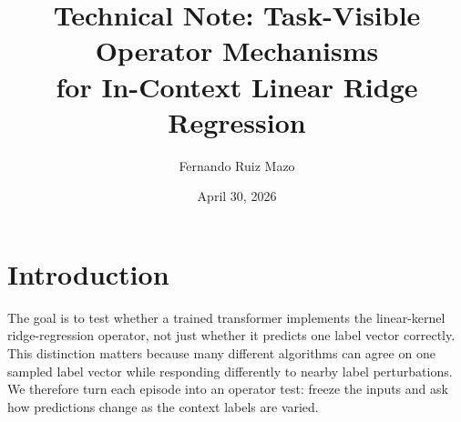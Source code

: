\documentclass[11pt]{article}
\title{Technical Note: Task-Visible Operator Mechanisms\\
for In-Context Linear Ridge Regression}
\author{Fernando Ruiz Mazo}
\date{April 30, 2026}
\begin{document}
\maketitle

\section{Introduction}

The goal is to test whether a trained transformer implements the linear-kernel ridge-regression
operator, not just whether it predicts one label vector correctly. This distinction matters because
many different algorithms can agree on one sampled label vector while responding differently to
nearby label perturbations. We therefore turn each episode into an operator test: freeze the inputs
and ask how predictions change as the context labels are varied.
\end{document}

